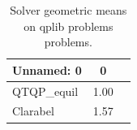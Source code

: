 \begin{table}
\caption{Solver geometric means on qplib problems problems.}
\label{t-qplib problems-geom_mean}
\begin{tabular}{lcc}
\toprule
Unnamed: 0 & 0 \\
\midrule
QTQP_equil & 1.00 \\
Clarabel & 1.57 \\
\bottomrule
\end{tabular}
\end{table}
